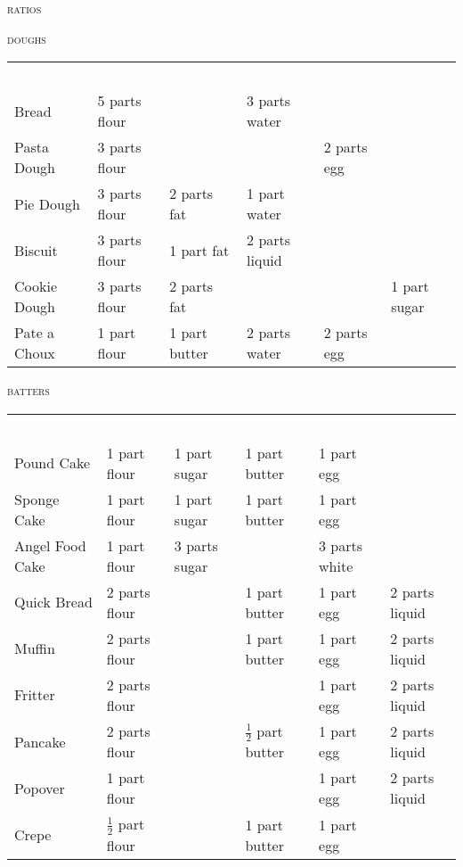 \documentclass[letterpaper,11pt]{article}
\newcommand{\sectionheader}[1]{
    \vspace{0.5em}
    {\small\textsc{#1}} \\
}
\begin{document}
\normalsize

\pagestyle{empty}
{\huge\scshape{ratios}}


\sectionheader{doughs}
{ \small
\begin{tabularx}{\textwidth}{ X X X X X X }
\rowcolor{white}
~ \\
Bread & 5 parts flour & & 3 parts water & & \\
Pasta Dough & 3 parts flour & & & 2 parts egg & \\
Pie Dough & 3 parts flour & 2 parts fat & 1 part water & & \\
Biscuit & 3 parts flour & 1 part fat & 2 parts liquid & & \\
Cookie Dough & 3 parts flour & 2 parts fat & & & 1 part sugar \\
Pate a Choux & 1 part flour & 1 part butter & 2 parts water & 2 parts egg & \\
\end{tabularx}
}

\sectionheader{batters}
{ \small
\begin{tabularx}{\textwidth}{ l X X X X X }
\rowcolor{white}
~ \\
Pound Cake & 1 part flour & 1 part sugar & 1 part butter & 1 part egg & \\
Sponge Cake & 1 part flour & 1 part sugar & 1 part butter & 1 part egg & \\
Angel Food Cake & 1 part flour & 3 parts sugar & & 3 parts white & \\
Quick Bread & 2 parts flour & & 1 part butter & 1 part egg & 2 parts liquid \\
Muffin & 2 parts flour & & 1 part butter & 1 part egg & 2 parts liquid \\
Fritter & 2 parts flour & & & 1 part egg & 2 parts liquid \\
Pancake & 2 parts flour & & $\frac{1}{2}$ part butter & 1 part egg & 2 parts liquid \\
Popover & 1 part flour & & & 1 part egg & 2 parts liquid \\
Crepe & $\frac{1}{2}$ part flour & & 1 part butter & 1 part egg & \\
\end{tabularx}
}
\end{document}
